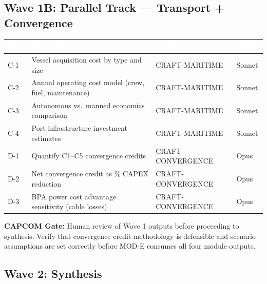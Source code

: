 \documentclass[11pt,letterpaper]{article}
\newcommand{\tableheader}[1]{\textbf{\sffamily\textcolor{white}{#1}}}
\begin{document}
\subsection{Wave 1B: Parallel Track --- Transport + Convergence}

\begin{center}
\begin{tabularx}{\textwidth}{L{2cm}L{5cm}C{1.5cm}X}
\toprule
{}
\tableheader{Task} & \tableheader{Description} & \tableheader{Agent} & \tableheader{Model} \\
\midrule
C-1 & Vessel acquisition cost by type and size & CRAFT-MARITIME & Sonnet \\
C-2 & Annual operating cost model (crew, fuel, maintenance) & CRAFT-MARITIME & Sonnet \\
C-3 & Autonomous vs.\ manned economics comparison & CRAFT-MARITIME & Sonnet \\
C-4 & Port infrastructure investment estimates & CRAFT-MARITIME & Sonnet \\
D-1 & Quantify C1--C5 convergence credits & CRAFT-CONVERGENCE & Opus \\
D-2 & Net convergence credit as \% CAPEX reduction & CRAFT-CONVERGENCE & Opus \\
D-3 & BPA power cost advantage sensitivity (cable losses) & CRAFT-CONVERGENCE & Opus \\
\bottomrule
\end{tabularx}
\end{center}

\textbf{CAPCOM Gate:} Human review of Wave 1 outputs before proceeding to synthesis.
Verify that convergence credit methodology is defensible and scenario assumptions are
set correctly before MOD-E consumes all four module outputs.

\subsection{Wave 2: Synthesis}
\end{document}
